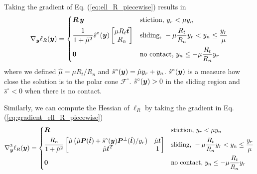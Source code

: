 Taking the gradient of Eq. (\ref{eq:ell_R_piecewise}) results in
\begin{equation}
	\nabla_\vf{y}\ell_R(\vf{y}) = 
\begin{dcases}
	\vf{R}\,\vf{y} & 
	\text{stiction, } y_r < \mu y_n\\
	\frac{1}{1+\tilde\mu^2}\hat{s}^\circ(\vf{y})\begin{bmatrix}
		\mu R_t\hat{\vf{t}}\\
		R_n\\
	\end{bmatrix} &
	\text{sliding, } -\mu \frac{R_t}{R_n} y_r < y_n \leq \frac{y_r}{\mu}\\
    \vf{0} & \text{no contact, } y_n \leq -\mu \frac{R_t}{R_n} y_r
\end{dcases}	  
	\label{eq:gradient_ell_R_piecewise}
\end{equation}
where we defined $\hat{\mu}=\mu R_t/R_n$ and $\hat{s}^\circ({\bm{y}}) =
\hat{\mu}y_r+y_n$. $\hat{s}^\circ({\bm{y}})$ is a measure how close the solution
is to the polar cone $\mathcal{F}^\circ$. $\hat{s}^\circ({\bm{y}}) > 0$ in the
sliding region and $\hat{s}^\circ<0$ when there is no contact.

Similarly, we can compute the Hessian of $\ell_R$ by taking the gradient in Eq.
(\ref{eq:gradient_ell_R_piecewise})
\begin{equation}
	\nabla_\vf{y}^2\ell_R(\vf{y}) = 
\begin{dcases}
	\vf{R} & 
	\text{stiction, } y_r < \mu y_n\\
	\frac{R_n}{1+\tilde\mu^2}
	\begin{bmatrix}
		\hat{\mu}\left(\hat{\mu}\vf{P}(\hat{\vf{t}})+\hat{s}^\circ(\vf{y})\vf{P}^\perp(\hat{\vf{t}})/y_r\right) & 
		\hat{\mu}\vf{t}\\
		\hat{\mu}\vf{t}^T & 
		1\\
	\end{bmatrix} &
	\text{sliding, } -\mu \frac{R_t}{R_n} y_r < y_n \leq \frac{y_r}{\mu}\\
    \vf{0} & \text{no contact, } y_n \leq -\mu \frac{R_t}{R_n} y_r
\end{dcases}	  
	\label{eq:hessian_ell_R_piecewise}
\end{equation}

